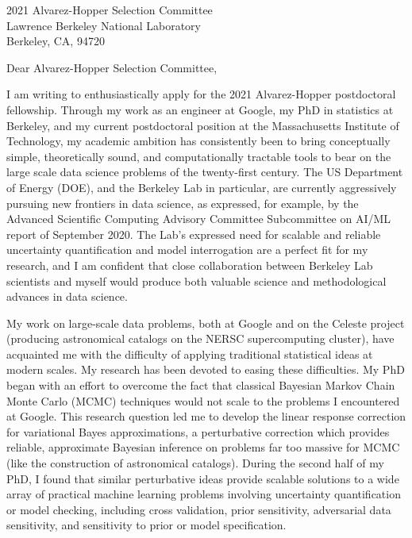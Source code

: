 \documentclass{letter}
\begin{document}
\begin{letter}{2021 Alvarez-Hopper Selection Committee\\
Lawrence Berkeley National Laboratory\\
Berkeley, CA, 94720}


\opening{Dear Alvarez-Hopper Selection Committee,}

I am writing to enthusiastically apply for the 2021 Alvarez-Hopper postdoctoral
fellowship.  Through my work as an engineer at Google, my PhD in statistics at
Berkeley, and my current postdoctoral position at the Massachusetts Institute of
Technology, my academic ambition has consistently been to bring conceptually
simple, theoretically sound, and computationally tractable tools to bear on the
large scale data science problems of the twenty-first century.  The US
Department of Energy (DOE), and the Berkeley Lab in particular, are currently
aggressively pursuing new frontiers in data science, as expressed, for example,
by the Advanced Scientific Computing Advisory Committee Subcommittee on AI/ML
report of September 2020.  The Lab's expressed need for scalable and reliable
uncertainty quantification and model interrogation are a perfect fit for my
research, and I am confident that close collaboration between Berkeley
Lab scientists and myself would produce both valuable science and
methodological advances in data science.

My work on large-scale data problems, both at Google and on the Celeste project
(producing astronomical catalogs on the NERSC supercomputing cluster), have
acquainted me with the difficulty of applying traditional statistical ideas at
modern scales.  My research has been devoted to easing these difficulties.
My PhD began with an effort to overcome the fact that classical Bayesian Markov
Chain Monte Carlo (MCMC) techniques would not scale to the problems I
encountered at Google. This research question led me to develop the linear
response correction for variational Bayes approximations, a perturbative
correction which provides reliable, approximate Bayesian inference on problems
far too massive for MCMC (like the construction of astronomical catalogs).
During the second half of my PhD, I found that similar perturbative ideas
provide scalable solutions to a wide array of practical machine learning
problems involving uncertainty quantification or model checking, including cross
validation, prior sensitivity, adversarial data sensitivity, and sensitivity to
prior or model specification.


\end{letter}
\end{document}
